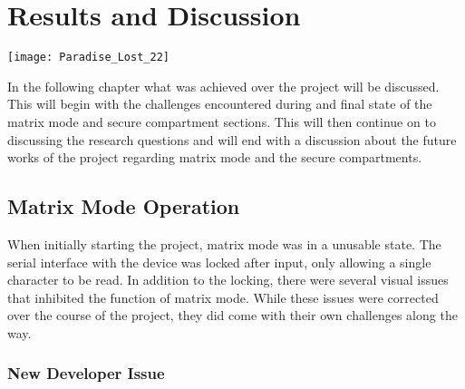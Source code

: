 
\chapter{Results and Discussion} %

\texttt{[image: Paradise\_Lost\_22]}

\label{Chapter 7} %

In the following chapter what was achieved over the project will be discussed. This will begin with the challenges encountered during and final state of the matrix mode and secure compartment sections. This will then continue on to discussing the research questions and will end with a discussion about the future works of the project regarding matrix mode and the secure compartments.


\section{Matrix Mode Operation}

\label{Ch7 Sec1}

When initially starting the project, matrix mode was in a unusable state. The serial interface with the device was locked after input, only allowing a single character to be read. In addition to the locking, there were several visual issues that inhibited the function of matrix mode. While these issues were corrected over the course of the project, they did come with their own challenges along the way. 

\subsection{New Developer Issue}

\label{Ch7 Sec1 Sub1}

